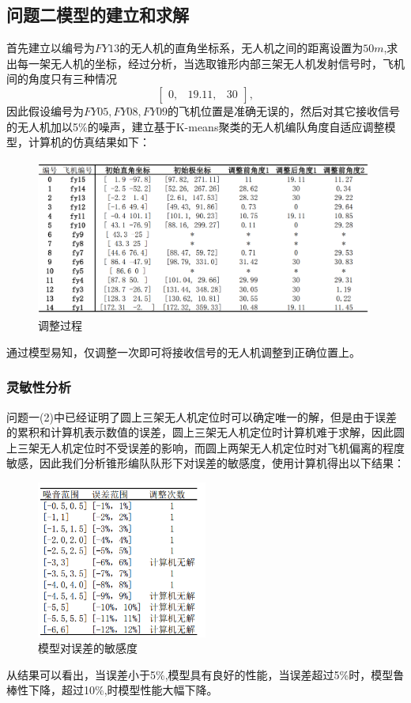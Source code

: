 \documentclass[withoutpreface,bwprint]{cumcmthesis} %
\begin{document}
\subsection{问题二模型的建立和求解}
首先建立以编号为$FY13$的无人机的直角坐标系，无人机之间的距离设置为$50m$,求出每一架无人机的坐标，经过分析，当选取锥形内部三架无人机发射信号时，飞机间的角度只有三种情况$$\begin{bmatrix}
0 ,& 19.11, & 30
\end{bmatrix},$$因此假设编号为$FY05,FY08,FY09$的飞机位置是准确无误的，然后对其它接收信号的无人机加以5\%的噪声，建立基于K-means聚类的无人机编队角度自适应调整模型，计算机的仿真结果如下：
\begin{figure}[H]
	\centering
	\includegraphics[width=0.99\textwidth]{9}
	\caption{调整过程}
	\label{9}
\end{figure}
通过模型易知，仅调整一次即可将接收信号的无人机调整到正确位置上。
\subsubsection{灵敏性分析}
问题一(2)中已经证明了圆上三架无人机定位时可以确定唯一的解，但是由于误差的累积和计算机表示数值的误差，圆上三架无人机定位时计算机难于求解，因此圆上三架无人机定位时不受误差的影响，而圆上两架无人机定位时对飞机偏离的程度敏感，因此我们分析锥形编队队形下对误差的敏感度，使用计算机得出以下结果：
\begin{figure}[H]
	\centering
	\includegraphics[width=0.5\textwidth]{10}
	\caption{模型对误差的敏感度}
	\label{10}
\end{figure}
从结果可以看出，当误差小于5\%,模型具有良好的性能，当误差超过5\%时，模型鲁棒性下降，超过10\%,时模型性能大幅下降。
	
\end{document}
